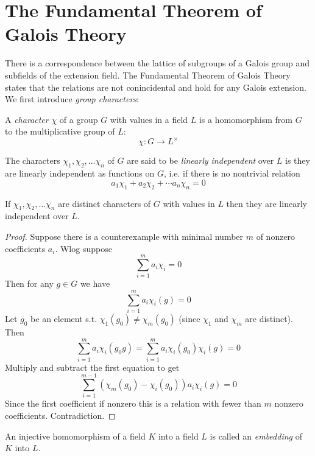 \documentclass[a4paper]{article}
\begin{document}
\section{The Fundamental Theorem of Galois Theory}
There is a correspondence between the lattice of subgroups of a Galois group and subfields of the extension field. The Fundamental Theorem of Galois Theory states that the relations are not conincidental and hold for any Galois extension. We first introduce \emph{group characters}:

\begin{definition}
    A \emph{character} $\chi$ of a group $G$ with values in a field $L$ is a homomorphism from $G$ to the multiplicative group of $L$:
    \[
        \chi: G \rightarrow L^\times
    \]
\end{definition}

\begin{definition}
    The characters $\chi_1, \chi_2, \ldots \chi_n$ of $G$ are said to be \emph{linearly independent} over $L$ is they are linearly independent as functions on $G$, i.e. if there is no nontrivial relation
    \[
        a_1 \chi_1 + a_2 \chi_2 + \cdots a_n \chi_n = 0
    \]
\end{definition}

\begin{theorem}
    If $\chi_1, \chi_2, \ldots \chi_n$ are distinct characters of $G$ with values in $L$ then they are linearly independent over $L$.
\end{theorem}

\begin{proof}
    Suppose there is a counterexample with minimal number $m$ of nonzero coefficients $a_i$. Wlog suppose
    \[
        \sum_{i=1}^m a_i \chi_i = 0
    \]
    Then for any $g \in G$ we have
    \[
        \sum_{i=1}^m a_i \chi_i(g) = 0
    \]
    Let $g_0$ be an element s.t. $\chi_1(g_0) ≠ \chi_m(g_0)$ (since $\chi_1$ and $\chi_m$ are distinct). Then
    \[
        \sum_{i=1}^m a_i \chi_i(g_0 g) = \sum_{i=1}^m a_i \chi_i(g_0) \chi_i(g) = 0
    \]
    Multiply and subtract the first equation to get
    \[
        \sum_{i=1}^{m-1} (\chi_m(g_0) - \chi_i(g_0))a_i \chi_i(g) = 0
    \]
    Since the first coefficient if nonzero this is a relation with fewer than $m$ nonzero coefficients. Contradiction.
\end{proof}

An injective homomorphism of a field $K$ into a field $L$ is called an \emph{embedding} of $K$ into $L$.
\end{document}

